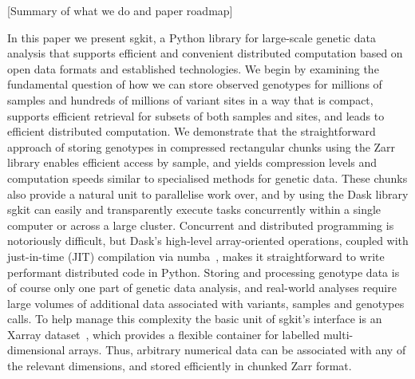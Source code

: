 \documentclass[9pt,lineno]{elife}
\begin{document}
[Summary of what we do and paper roadmap]

In this paper we present sgkit, a Python library for large-scale genetic data
analysis that supports efficient and convenient distributed computation based
on open data formats and established technologies. We begin by examining the
fundamental question of how we can store observed genotypes for millions of
samples and hundreds of millions of variant sites in a way that is compact,
supports efficient retrieval for subsets of both samples and sites, and leads
to efficient distributed computation. We demonstrate that the straightforward
approach of storing genotypes in compressed rectangular chunks using the Zarr
library enables efficient access by sample, and yields compression levels and
computation speeds similar to specialised methods for genetic data. These
chunks also provide
a natural unit %
to parallelise work over, and by using the Dask library sgkit can easily and
transparently execute tasks concurrently within a single computer or across a
large cluster. Concurrent and distributed programming is notoriously difficult,
but Dask's high-level array-oriented operations, coupled with just-in-time
(JIT) compilation via numba~\citep{lam2015numba}, makes it straightforward to
write performant distributed code in Python.
Storing and processing genotype data is of course only one part of
genetic data analysis, and real-world analyses require large volumes
of additional data associated with variants, samples and genotypes calls.
To help manage this complexity
the basic unit of sgkit's interface is an Xarray
dataset~\citep{hoyer2017xarray}, which provides a flexible container
for labelled multi-dimensional arrays. Thus, arbitrary numerical data
can be associated with any of the relevant dimensions, and stored
efficiently in chunked Zarr format.
\end{document}
